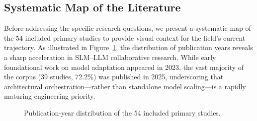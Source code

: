 \subsection{Systematic Map of the Literature}
\label{sec:study_characteristics}

Before addressing the specific research questions, we present a systematic map of the 54 included primary studies to provide visual context for the field's current trajectory. As illustrated in Figure~\ref{fig:publication-years}, the distribution of publication years reveals a sharp acceleration in SLM--LLM collaborative research. While early foundational work on model adaptation appeared in 2023, the vast majority of the corpus (39 studies, 72.2\%) was published in 2025, underscoring that architectural orchestration---rather than standalone model scaling---is a rapidly maturing engineering priority.

\begin{figure}[!htbp]
\centering
{}
\caption{Publication-year distribution of the 54 included primary studies.}
\label{fig:publication-years}
\end{figure}

